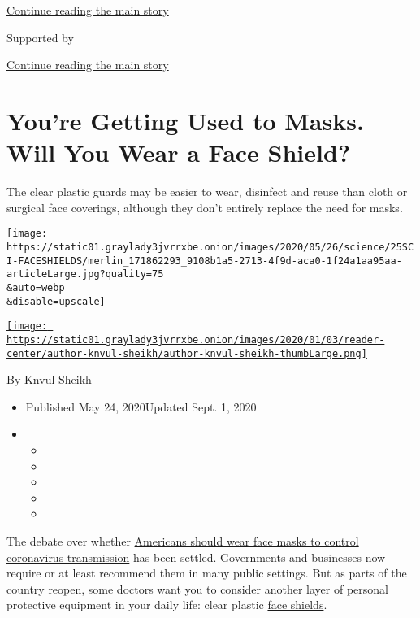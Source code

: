 \protect\hyperlink{after-top}{Continue reading the main story}

Supported by

\protect\hyperlink{after-sponsor}{Continue reading the main story}

\hypertarget{youre-getting-used-to-masks-will-you-wear-a-face-shield}{%
\section{You're Getting Used to Masks. Will You Wear a Face
Shield?}\label{youre-getting-used-to-masks-will-you-wear-a-face-shield}}

The clear plastic guards may be easier to wear, disinfect and reuse than
cloth or surgical face coverings, although they don't entirely replace
the need for masks.

\texttt{[image: https://static01.graylady3jvrrxbe.onion/images/2020/05/26/science/25SCI-FACESHIELDS/merlin\_171862293\_9108b1a5-2713-4f9d-aca0-1f24a1aa95aa-articleLarge.jpg?quality=75\\\&auto=webp\\\&disable=upscale]}

\href{https://www.nytimes3xbfgragh.onion/by/knvul-sheikh}{\texttt{[image: https://static01.graylady3jvrrxbe.onion/images/2020/01/03/reader-center/author-knvul-sheikh/author-knvul-sheikh-thumbLarge.png]}}

By \href{https://www.nytimes3xbfgragh.onion/by/knvul-sheikh}{Knvul
Sheikh}

\begin{itemize}
\item
  Published May 24, 2020Updated Sept. 1, 2020
\item
  \begin{itemize}
  \item
  \item
  \item
  \item
  \item
  \end{itemize}
\end{itemize}

The debate over whether
\href{https://www.nytimes3xbfgragh.onion/interactive/2020/health/coronavirus-best-face-masks.html}{Americans
should wear face masks to control coronavirus transmission} has been
settled. Governments and businesses now require or at least recommend
them in many public settings. But as parts of the country reopen, some
doctors want you to consider another layer of personal protective
equipment in your daily life: clear plastic
\href{https://www.nytimes3xbfgragh.onion/2020/09/01/well/live/face-shields-masks-valves-vents.html}{face
shields}.


